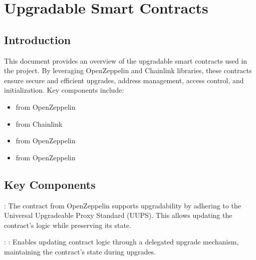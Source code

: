 \documentclass[a4paper,10pt,english]{sphinxmanual}
\begin{document}
\sphinxstepscope


\chapter{Upgradable Smart Contracts}
\label{\detokenize{docs_upgradable_contract:upgradable-smart-contracts}}\label{\detokenize{docs_upgradable_contract::doc}}

\section{Introduction}
\label{\detokenize{docs_upgradable_contract:introduction}}
\sphinxAtStartPar
This document provides an overview of the upgradable smart contracts used in the project. By leveraging OpenZeppelin and Chainlink libraries, these contracts ensure secure and efficient upgrades, address management, access control, and initialization. Key components include:
\begin{itemize}
\item {} 
\sphinxAtStartPar
{} from OpenZeppelin

\item {} 
\sphinxAtStartPar
{} from Chainlink

\item {} 
\sphinxAtStartPar
{} from OpenZeppelin

\item {} 
\sphinxAtStartPar
{} from OpenZeppelin

\end{itemize}


\section{Key Components}
\label{\detokenize{docs_upgradable_contract:key-components}}
\sphinxAtStartPar
{}

\sphinxAtStartPar
{}:
The  contract from OpenZeppelin supports upgradability by adhering to the Universal Upgradeable Proxy Standard (UUPS). This allows updating the contract’s logic while preserving its state.

\sphinxAtStartPar
{}:
\sphinxhyphen{} : Enables updating contract logic through a delegated upgrade mechanism, maintaining the contract’s state during upgrades.
\end{document}
